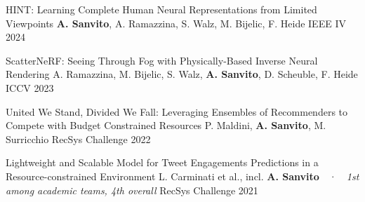 

\begin{cvhonors}

  \cvhonor
    {HINT: Learning Complete Human Neural Representations from Limited Viewpoints} %
    {\textbf{A. Sanvito}, A. Ramazzina, S. Walz, M. Bijelic, F. Heide} %
    {IEEE IV} %
    {2024} %

  \cvhonor
    {ScatterNeRF: Seeing Through Fog with Physically-Based Inverse Neural Rendering} %
    {A. Ramazzina, M. Bijelic, S. Walz, \textbf{A. Sanvito}, D. Scheuble, F. Heide} %
    {ICCV} %
    {2023} %

  \cvhonor
    {United We Stand, Divided We Fall: Leveraging Ensembles of Recommenders to Compete with Budget Constrained Resources} %
    {P. Maldini, \textbf{A. Sanvito}, M. Surricchio} %
    {RecSys Challenge} %
    {2022} %

  \cvhonor
    {Lightweight and Scalable Model for Tweet Engagements Predictions in a Resource-constrained Environment} %
    {L. Carminati et al., incl. \textbf{A. Sanvito}~~·~~\textit{1st among academic teams, 4th overall}} %
    {RecSys Challenge} %
    {2021} %


\end{cvhonors}
